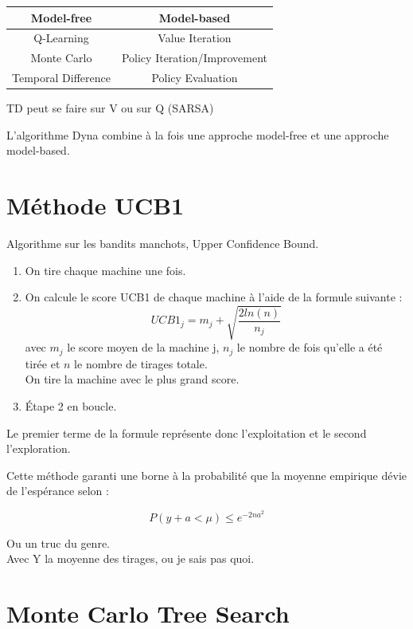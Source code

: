\documentclass{article}
\begin{document}
\vspace{0.5cm}

\begin{center}
\begin{tabular}{c|c}
    Model-free & Model-based \\
    \hline
    Q-Learning & Value Iteration \\
    Monte Carlo & Policy Iteration/Improvement \\
    Temporal Difference & Policy Evaluation \\
\end{tabular}
\end{center}

TD peut se faire sur V ou sur Q (SARSA)

\vspace{0.5cm}

L'algorithme Dyna combine à la fois une approche model-free et une approche model-based. 

\section{Méthode UCB1}

Algorithme sur les bandits manchots, Upper Confidence Bound.

\begin{enumerate}
    \item On tire chaque machine une fois.
    \item On calcule le score UCB1 de chaque machine à l'aide de la formule suivante : $$ UCB1_j = m_j + \sqrt{\frac{2 ln(n)}{n_j}} $$ avec $m_j$ le score moyen de la machine j, $n_j$ le nombre de fois qu'elle a été tirée et $n$ le nombre de tirages totale. \\ On tire la machine avec le plus grand score.
    \item Étape 2 en boucle.
\end{enumerate}

Le premier terme de la formule représente donc l'exploitation et le second l'exploration.

Cette méthode garanti une borne à la probabilité que la moyenne empirique dévie de l'espérance selon :

$$ P(y + a < \mu) \leq e^{-2na^2} $$

Ou un truc du genre. \\
Avec Y la moyenne des tirages, ou je sais pas quoi.

\section{Monte Carlo Tree Search}
\end{document}
